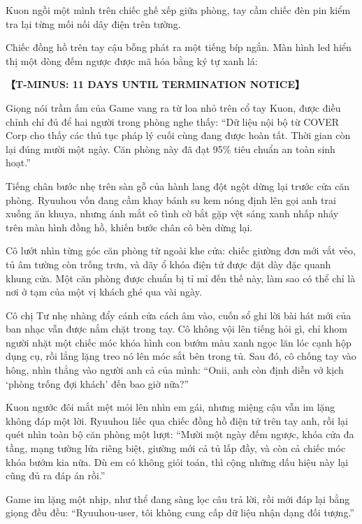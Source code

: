 ﻿\documentclass[../main.tex]{subfiles}
\begin{document}
Kuon ngồi một mình trên chiếc ghế xếp giữa phòng, tay cầm chiếc đèn pin kiểm tra lại từng mối nối dây điện trên tường.

Chiếc đồng hồ trên tay cậu bỗng phát ra một tiếng bíp ngắn. Màn hình led hiển thị một dòng đếm ngược được mã hóa bằng ký tự xanh lá:

\begin{center}
    \textbf{【T-MINUS: 11 DAYS UNTIL TERMINATION NOTICE】}
\end{center}

Giọng nói trầm ấm của Game vang ra từ loa nhỏ trên cổ tay Kuon, được điều chỉnh chỉ đủ để hai người trong phòng nghe thấy: ``Dữ liệu nội bộ từ COVER Corp cho thấy các thủ tục pháp lý cuối cùng đang được hoàn tất. Thời gian còn lại đúng mười một ngày. Căn phòng này đã đạt 95\% tiêu chuẩn an toàn sinh hoạt.''

Tiếng chân bước nhẹ trên sàn gỗ của hành lang đột ngột dừng lại trước cửa căn phòng. Ryuuhou vốn đang cầm khay bánh su kem nóng định lên gọi anh trai xuống ăn khuya, nhưng ánh mắt cô tình cờ bắt gặp vệt sáng xanh nhấp nháy trên màn hình đồng hồ, khiến bước chân cô bèn dừng lại. 

Cô lướt nhìn từng góc căn phòng từ ngoài khe cửa: chiếc giường đơn mới vắt vẻo, tủ âm tường còn trống trơn, và dãy ổ khóa điện tử được đặt dày đặc quanh khung cửa. Một căn phòng được chuẩn bị tỉ mỉ đến thế này, làm sao có thể chỉ là nơi ở tạm của một vị khách ghé qua vài ngày.

Cô chị Tư nhẹ nhàng đẩy cánh cửa cách âm vào, cuốn sổ ghi lời bài hát mới của ban nhạc vẫn được nắm chặt trong tay. Cô không vội lên tiếng hỏi gì, chỉ khom người nhặt một chiếc móc khóa hình con bướm màu xanh ngọc lăn lóc cạnh hộp dụng cụ, rồi lẳng lặng treo nó lên móc sắt bên trong tủ. Sau đó, cô chống tay vào hông, nhìn thẳng vào người anh cả của mình: ``Onii, anh còn định diễn vở kịch `phòng trống đợi khách' đến bao giờ nữa?''

Kuon ngước đôi mắt mệt mỏi lên nhìn em gái, nhưng miệng cậu vẫn im lặng không đáp một lời. Ryuuhou liếc qua chiếc đồng hồ điện tử trên tay anh, rồi lại quét nhìn toàn bộ căn phòng một lượt: ``Mười một ngày đếm ngược, khóa cửa đa tầng, mạng tường lửa riêng biệt, giường mới cả tủ lấp đầy, và còn cả chiếc móc khóa bướm kia nữa. Dù em có không giỏi toán, thì cộng những dấu hiệu này lại cũng đủ ra đáp án rồi.''

Game im lặng một nhịp, như thể đang sàng lọc câu trả lời, rồi mới đáp lại bằng giọng đều đều: ``Ryuuhou-user, tôi không cung cấp dữ liệu nhận dạng đối tượng.''
\end{document}
